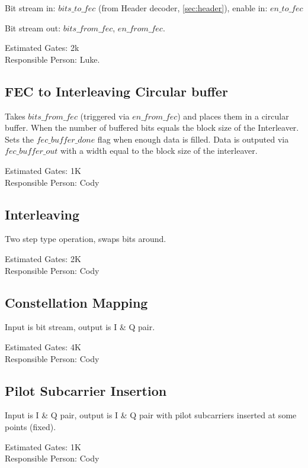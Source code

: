 \documentclass[10pt]{article}
\begin{document}
	Bit stream in: $bits\_to\_fec$ (from Header decoder, \autoref{sec:header}),
	enable in: $en\_to\_fec$

	Bit stream out: $bits\_from\_fec$, $en\_from\_fec$.

	Estimated Gates: 2k \\
	Responsible Person: Luke.

	\subsection{FEC to Interleaving Circular buffer}
	\label{sec:fec_buffer}

	Takes $bits\_from\_fec$ (triggered via $en\_from\_fec$) and places them
	in a circular buffer. When the number of buffered bits equals the block
	size of the Interleaver. Sets the $fec\_buffer\_done$ flag when enough
	data is filled. Data is outputed via $fec\_buffer\_out$ with a width
	equal to the block size of the interleaver.

	Estimated Gates: 1K \\
	Responsible Person: Cody

	\subsection{Interleaving}
	\label{sec:interleaving}

	Two step type operation, swaps bits around.

	Estimated Gates: 2K \\
	Responsible Person: Cody

	\subsection{Constellation Mapping}
	\label{sec:constellation}

	Input is bit stream, output is I \& Q pair.

	Estimated Gates: 4K \\
	Responsible Person: Cody

	\subsection{Pilot Subcarrier Insertion}
	\label{sec:pilot}

	Input is I \& Q pair, output is I \& Q pair with pilot subcarriers
	inserted at some points (fixed).

	Estimated Gates: 1K \\
	Responsible Person: Cody
\end{document}
